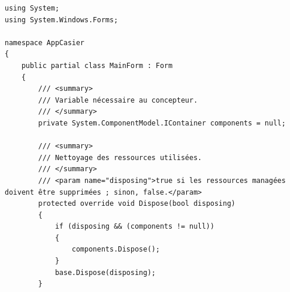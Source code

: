 \documentclass[main.tex]{subfiles}
\begin{document}
\begin{lstlisting}
using System;
using System.Windows.Forms;

namespace AppCasier
{
    public partial class MainForm : Form
    {
        /// <summary>
        /// Variable nécessaire au concepteur.
        /// </summary>
        private System.ComponentModel.IContainer components = null;

        /// <summary>
        /// Nettoyage des ressources utilisées.
        /// </summary>
        /// <param name="disposing">true si les ressources managées doivent être supprimées ; sinon, false.</param>
        protected override void Dispose(bool disposing)
        {
            if (disposing && (components != null))
            {
                components.Dispose();
            }
            base.Dispose(disposing);
        }


\end{lstlisting}
\end{document}
